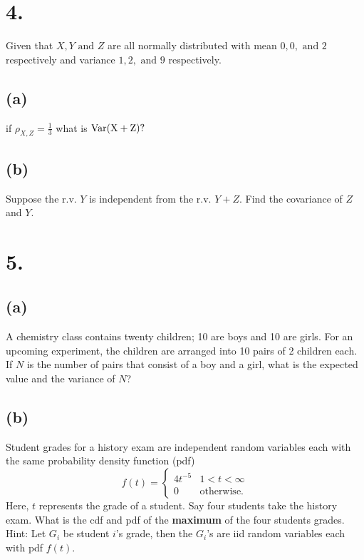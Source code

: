 \documentclass{article}
\begin{document}
\section*{4.}
{\Large 

Given that $X,Y\text{ and } Z$ are all normally distributed with mean $0,0,\text{ and } 2$ respectively and variance $1,2,\text{ and } 9$ respectively.

\subsection*{(a)}
if $\rho_{X,Z}=\frac13$ what is $\rm {Var} (X+Z)?$ 

\subsection*{(b)}
Suppose the r.v. $Y$ is independent from the r.v. $Y+Z$. Find the covariance of $Z$ and $Y.$


}

\section*{5.}
{\Large 

\subsection*{(a)}
A chemistry class contains twenty children; 10 are boys and 10 are girls. For an upcoming experiment, the children are arranged into 10 pairs of 2 children each.  If $ N$ is the number of pairs that consist of a boy and a girl, what is the expected value and the variance of $N$? 

\subsection*{(b)}
Student grades for a history exam are independent random variables each with the same probability density function (pdf)
\[f(t)=\begin{cases}4t^{-5}& 1<t<\infty\\ 0& \text{otherwise.}  \end{cases}\]
Here, $t$ represents the grade of a student.  Say four students  take  the history exam. What is the cdf and pdf  of the {\bf{maximum}} of the four students grades. Hint: Let $G_i$ be student $i$'s grade, then the  $G_i$'s are iid random variables each with pdf $f(t)$.  


}
\end{document}
